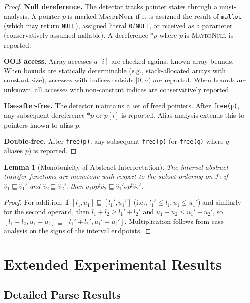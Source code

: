 \documentclass[11pt,a4paper]{article}
\newtheorem{lemma}[theorem]{Lemma}
\begin{document}
\begin{appendices}
\begin{proof}
\textbf{Null dereference.}
The detector tracks pointer states through a must-analysis. A pointer
$p$ is marked \textsc{MaybeNull} if it is assigned the result of
\texttt{malloc} (which may return \texttt{NULL}), assigned literal
\texttt{0}/\texttt{NULL}, or received as a parameter (conservatively
assumed nullable). A dereference $*p$ where $p$ is \textsc{MaybeNull}
is reported.

\textbf{OOB access.}
Array accesses $a[i]$ are checked against known array bounds. When
bounds are statically determinable (e.g., stack-allocated arrays with
constant size), accesses with indices outside $[0, n)$ are reported.
When bounds are unknown, all accesses with non-constant indices are
conservatively reported.

\textbf{Use-after-free.}
The detector maintains a set of freed pointers. After \texttt{free(p)},
any subsequent dereference $*p$ or $p[i]$ is reported. Alias analysis
extends this to pointers known to alias $p$.

\textbf{Double-free.}
After \texttt{free(p)}, any subsequent \texttt{free(p)} (or
\texttt{free(q)} where $q$ aliases $p$) is reported.
\end{proof}

\begin{lemma}[Monotonicity of Abstract Interpretation]
The interval abstract transfer functions are monotone with respect to
the subset ordering on $\mathcal{I}$:
if $\hat{v}_1 \sqsubseteq \hat{v}_1'$ and
$\hat{v}_2 \sqsubseteq \hat{v}_2'$, then
$\hat{v}_1 \mathbin{op}^{\sharp} \hat{v}_2 \sqsubseteq
\hat{v}_1' \mathbin{op}^{\sharp} \hat{v}_2'$.
\end{lemma}

\begin{proof}
For addition: if $[l_1, u_1] \sqsubseteq [l_1', u_1']$ (i.e.,
$l_1' \leq l_1, u_1 \leq u_1'$) and similarly for the second operand,
then $l_1 + l_2 \geq l_1' + l_2'$ and $u_1 + u_2 \leq u_1' + u_2'$,
so $[l_1 + l_2, u_1 + u_2] \sqsubseteq [l_1' + l_2', u_1' + u_2']$.
Multiplication follows from case analysis on the signs of the interval
endpoints.
\end{proof}


\section{Extended Experimental Results}\label{app:extended}

\subsection{Detailed Parse Results}


\end{appendices}
\end{document}
